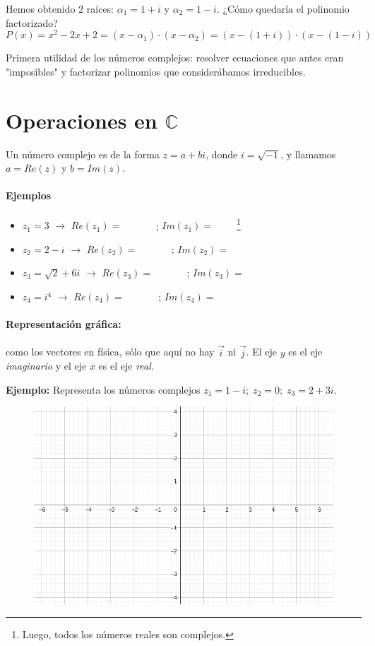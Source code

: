 \documentclass[palatino,nosec]{Docencia}
\renewcommand{\vec}[1]{\overset{\rightarrow}{#1}}
\begin{document}
Hemos obtenido 2 raíces: $α_1 = 1+i$ y $α_2 = 1-i$. ¿Cómo quedaría el polinomio factorizado? \[P(x) = x^2-2x+2 = (x-α_1)·(x-α_2) = (x-(1+i))·(x-(1-i))\]

Primera utilidad de los números complejos: resolver ecuaciones que antes eran "imposibles" y factorizar polinomios que considerábamos irreducibles.


\section{Operaciones en $ℂ$}

Un número complejo es de la forma $z=a+bi$, donde $i=\sqrt{-1}$, y llamamos $a=Re(z)$ y $b=Im(z)$. 

\paragraph{Ejemplos}
\begin{itemize}
	\item $z_1 = 3$ $\to$ $Re(z_1) = \;\;\quad\quad\;\;\;$; $Im(z_1) = \;\;\;\;\;\;\;$ \footnote{Luego, todos los números reales son complejos.}
	\item $z_2 = 2-i$ $\to$ $Re(z_2) = \;\;\quad\quad\;\;\;$; $Im(z_2) = \;\;\;\;\;\;\;$
	\item $z_3 = \sqrt{2}+6i$ $\to$ $Re(z_3) = \;\;\quad\quad\;\;\;$; $Im(z_3) = \;\;\;\;\;\;\;$
	\item $z_4 = i^4$ $\to$ $Re(z_4) = \;\;\quad\quad\;\;\;$; $Im(z_4) = \;\;\;\;\;\;\;$
\end{itemize}

\paragraph{Representación gráfica:} como los vectores en física, sólo que aquí no hay $\vec{i}$ ni $\vec{j}$. El eje $y$ es el eje \textit{imaginario} y el eje $x$ es el eje \textit{real}.

\textbf{Ejemplo:} Representa los números complejos $z_1 = 1-i;\;z_2 = 0;\; z_3 = 2+3i$.

\begin{figure}[hbtp]
\centering
\includegraphics[scale=0.5]{../grid.png}
\end{figure}
\end{document}
